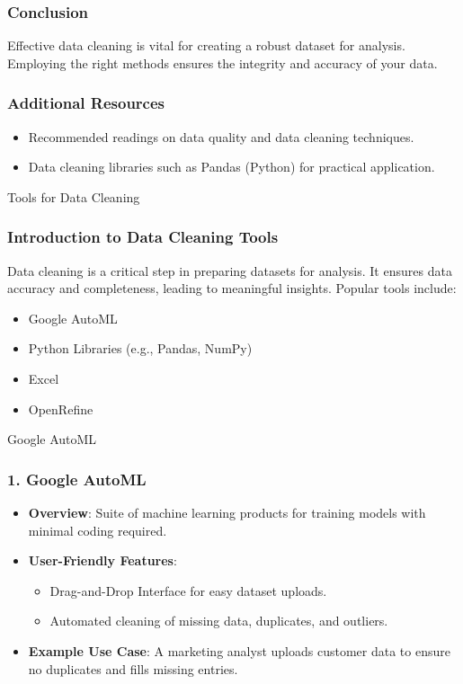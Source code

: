\documentclass[aspectratio=169]{beamer}
\begin{document}
\begin{frame}
    \frametitle{Conclusion}
    Effective data cleaning is vital for creating a robust dataset for analysis.  
    Employing the right methods ensures the integrity and accuracy of your data.
\end{frame}

\begin{frame}
    \frametitle{Additional Resources}
    \begin{itemize}
        \item Recommended readings on data quality and data cleaning techniques.
        \item Data cleaning libraries such as Pandas (Python) for practical application.
    \end{itemize}
\end{frame}

\begin{frame}{Tools for Data Cleaning}
    \frametitle{Introduction to Data Cleaning Tools}
    Data cleaning is a critical step in preparing datasets for analysis. It ensures data accuracy and completeness, leading to meaningful insights. Popular tools include:
    \begin{itemize}
        \item Google AutoML
        \item Python Libraries (e.g., Pandas, NumPy)
        \item Excel
        \item OpenRefine
    \end{itemize}
\end{frame}

\begin{frame}{Google AutoML}
    \frametitle{1. Google AutoML}
    \begin{itemize}
        \item \textbf{Overview}: Suite of machine learning products for training models with minimal coding required.
        \item \textbf{User-Friendly Features}:
            \begin{itemize}
                \item Drag-and-Drop Interface for easy dataset uploads.
                \item Automated cleaning of missing data, duplicates, and outliers.
            \end{itemize}
        \item \textbf{Example Use Case}: A marketing analyst uploads customer data to ensure no duplicates and fills missing entries.
    \end{itemize}
\end{frame}
\end{document}
